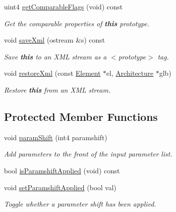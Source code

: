 \begin{DoxyCompactItemize}
uint4 \mbox{\hyperlink{class_func_proto_aeb1c9aa013921f2738ad28dce59867e6}{get\+Comparable\+Flags}} (void) const
\begin{DoxyCompactList}\small\item\em Get the comparable properties of {\bfseries{this}} prototype. \end{DoxyCompactList}\item 
void \mbox{\hyperlink{class_func_proto_a4da5ce755480a4eded9bedff2c6e274f}{save\+Xml}} (ostream \&s) const
\begin{DoxyCompactList}\small\item\em Save {\bfseries{this}} to an X\+ML stream as a $<$prototype$>$ tag. \end{DoxyCompactList}\item 
void \mbox{\hyperlink{class_func_proto_a4c4f9da74ee904e6abfa195bd843521e}{restore\+Xml}} (const \mbox{\hyperlink{class_element}{Element}} $\ast$el, \mbox{\hyperlink{class_architecture}{Architecture}} $\ast$glb)
\begin{DoxyCompactList}\small\item\em Restore {\bfseries{this}} from an X\+ML stream. \end{DoxyCompactList}\end{DoxyCompactItemize}
\subsection*{Protected Member Functions}
\begin{DoxyCompactItemize}
\item 
void \mbox{\hyperlink{class_func_proto_a75f9569f65cd6472f80d3e85d8453ced}{param\+Shift}} (int4 paramshift)
\begin{DoxyCompactList}\small\item\em Add parameters to the front of the input parameter list. \end{DoxyCompactList}\item 
bool \mbox{\hyperlink{class_func_proto_a7b7a58bea827081d275ae6112df7dce5}{is\+Paramshift\+Applied}} (void) const
\item 
void \mbox{\hyperlink{class_func_proto_ab1a494d8691b68a76a56495907ab9f6d}{set\+Paramshift\+Applied}} (bool val)
\begin{DoxyCompactList}\small\item\em Toggle whether a parameter shift has been applied. \end{DoxyCompactList}\end{DoxyCompactItemize}


